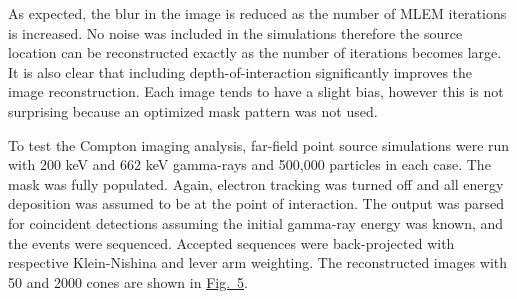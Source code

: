 \documentclass[10pt]{article}
\begin{document}
As expected, the blur in the image is reduced as the number of MLEM iterations is increased. No noise was included in the simulations therefore the source location can be reconstructed exactly as the number of iterations becomes large. It is also clear that including depth-of-interaction significantly improves the image reconstruction. Each image tends to have a slight bias, however this is not surprising because an optimized mask pattern was not used. 

To test the Compton imaging analysis, far-field point source simulations were run with 200 keV and 662 keV gamma-rays and 500,000 particles in each case. The mask was fully populated. Again, electron tracking was turned off and all energy deposition was assumed to be at the point of interaction. The output was parsed for coincident detections assuming the initial gamma-ray energy was known, and the events were sequenced. Accepted sequences were back-projected with respective Klein-Nishina and lever arm weighting. The reconstructed images with 50 and 2000 cones are shown in \hyperlink{fig5}{Fig.~5}. 
\end{document}

